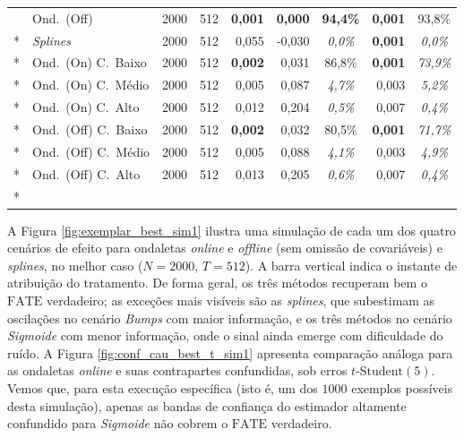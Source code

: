 {\begin{longtable}{@{}llccrrcrc@{}}
   & Ond.\ (Off) & 2000 & 512 & \textbf{0{,001}} & \textbf{0{,000}} & \textbf{94{,4\%}} & \textbf{0{,001}} & 93{,}8\% \\*
   & \emph{Splines} & 2000 & 512 & 0{,055} & -0{,}030 & \textit{0{,0\%}} & \textbf{0{,001}} & \textit{0{,0\%}} \\*
   & Ond.\ (On) C.\ Baixo & 2000 & 512 & \textbf{0{,002}} & 0{,031} & 86{,8\%} & \textbf{0{,001}} & \textit{73{,9\%}} \\*
   & Ond.\ (On) C.\ Médio & 2000 & 512 & 0{,005} & 0{,087} & \textit{4{,7\%}} & 0{,003} & \textit{5{,2\%}} \\*
   & Ond.\ (On) C.\ Alto & 2000 & 512 & 0{,}012 & 0{,}204 & \textit{0{,5\%}} & 0{,007} & \textit{0{,4\%}} \\*
   & Ond.\ (Off) C.\ Baixo & 2000 & 512 & \textbf{0{,002}} & 0{,032} & 80{,5\%} & \textbf{0{,001}} & \textit{71{,7\%}} \\*
   & Ond.\ (Off) C.\ Médio & 2000 & 512 & 0{,005} & 0{,088} & \textit{4{,1\%}} & 0{,003} & \textit{4{,9\%}} \\*
   & Ond.\ (Off) C.\ Alto & 2000 & 512 & 0{,}013 & 0{,}205 & \textit{0{,6\%}} & 0{,007} & \textit{0{,4\%}} \\*
\end{longtable}
}

A Figura \ref{fig:exemplar_best_sim1} ilustra uma simulação de cada um dos quatro cenários de efeito para ondaletas \emph{online} e \emph{offline} (sem omissão de covariáveis) e \emph{splines}, no melhor caso (\(N = 2000\), \(T = 512\)).
A barra vertical indica o instante de atribuição do tratamento.
De forma geral, os três métodos recuperam bem o \(\mathrm{FATE}\) verdadeiro; as exceções mais visíveis são as \emph{splines}, que subestimam as oscilações no cenário \emph{Bumps} com maior informação, e os três métodos no cenário \emph{Sigmoide} com menor informação, onde o sinal ainda emerge com dificuldade do ruído.
A Figura \ref{fig:conf_cau_best_t_sim1} apresenta comparação análoga para as ondaletas \emph{online} e suas contrapartes confundidas, sob erros \(t\text{-Student}(5)\).
Vemos que, para esta execução específica (isto é, um dos \(1000\) exemplos possíveis desta simulação), apenas as bandas de confiança do estimador altamente confundido para \emph{Sigmoide} não cobrem o \(\mathrm{FATE}\) verdadeiro.

